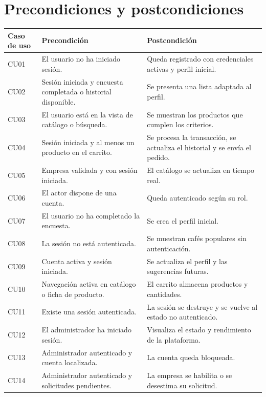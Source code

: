 \section{Precondiciones y postcondiciones}
\begin{longtable}{p{4.2cm}p{5.1cm}p{5.1cm}}
\hline\textbf{Caso de uso}&\textbf{Precondición}&\textbf{Postcondición}\\\hline
CU01&El usuario no ha iniciado sesión.&Queda registrado con credenciales activas y perfil inicial.\\
CU02&Sesión iniciada y encuesta completada o historial disponible.&Se presenta una lista adaptada al perfil.\\
CU03&El usuario está en la vista de catálogo o búsqueda.&Se muestran los productos que cumplen los criterios.\\
CU04&Sesión iniciada y al menos un producto en el carrito.&Se procesa la transacción, se actualiza el historial y se envía el pedido.\\
CU05&Empresa validada y con sesión iniciada.&El catálogo se actualiza en tiempo real.\\
CU06&El actor dispone de una cuenta.&Queda autenticado según su rol.\\
CU07&El usuario no ha completado la encuesta.&Se crea el perfil inicial.\\
CU08&La sesión no está autenticada.&Se muestran cafés populares sin autenticación.\\
CU09&Cuenta activa y sesión iniciada.&Se actualiza el perfil y las sugerencias futuras.\\
CU10&Navegación activa en catálogo o ficha de producto.&El carrito almacena productos y cantidades.\\
CU11&Existe una sesión autenticada.&La sesión se destruye y se vuelve al estado no autenticado.\\
CU12&El administrador ha iniciado sesión.&Visualiza el estado y rendimiento de la plataforma.\\
CU13&Administrador autenticado y cuenta localizada.&La cuenta queda bloqueada.\\
CU14&Administrador autenticado y solicitudes pendientes.&La empresa se habilita o se desestima su solicitud.\\
\hline
\end{longtable}

